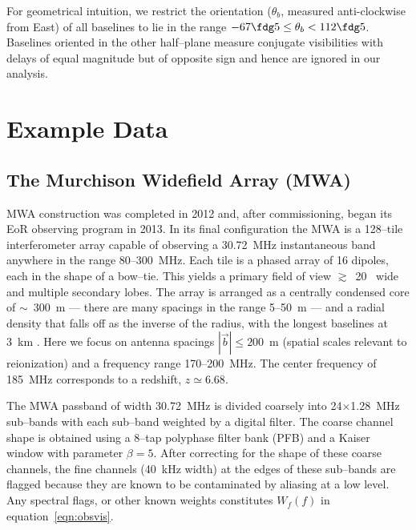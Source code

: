 \documentclass[preprint2,iop,numberedappendix]{emulateapj}
\begin{document}
For geometrical intuition, we restrict the orientation ($\theta_b$, measured anti-clockwise from East) of all baselines to lie in the range $-67\fdg 5 \leq \theta_b < 112\fdg 5$. Baselines oriented in the other half--plane measure conjugate visibilities with delays of equal magnitude but of opposite sign and hence are ignored in our analysis.

\section{Example Data}\label{sec:instrument}

\subsection{The Murchison Widefield Array (MWA)}

MWA construction was completed in 2012 and, after commissioning, began its EoR observing program in 2013. In its final configuration the MWA is a 128--tile interferometer array capable of observing a 30.72~MHz instantaneous band anywhere in the range 80--300~MHz. Each tile is a phased array of 16 dipoles, each in the shape of a bow--tie. This yields a primary field of view $\gtrsim$~20\arcdeg~ wide and multiple secondary lobes. The array is arranged as a centrally condensed core of $\sim$~300~m --- there are many spacings in the range 5--50~m --- and a radial density that falls off as the inverse of the radius, with the longest baselines at 3~km \citep{bea12}. Here we focus on antenna spacings $|\vec{b}| \le 200$~m (spatial scales relevant to reionization) and a frequency range 170--200~MHz. The center frequency of 185~MHz corresponds to a redshift, $z\simeq 6.68$.

The MWA passband of width 30.72~MHz is divided coarsely into 24$\times$1.28~MHz sub--bands with each sub--band weighted by a digital filter. The coarse channel shape is obtained using a 8--tap polyphase filter bank (PFB) and a Kaiser window with parameter $\beta=5$. After correcting for the shape of these coarse channels, the fine channels (40~kHz width) at the edges of these sub--bands are flagged because they are known to be contaminated by aliasing at a low level. Any spectral flags, or other known weights constitutes $W_f(f)$ in equation~\ref{eqn:obsvis}. 

\end{document}
